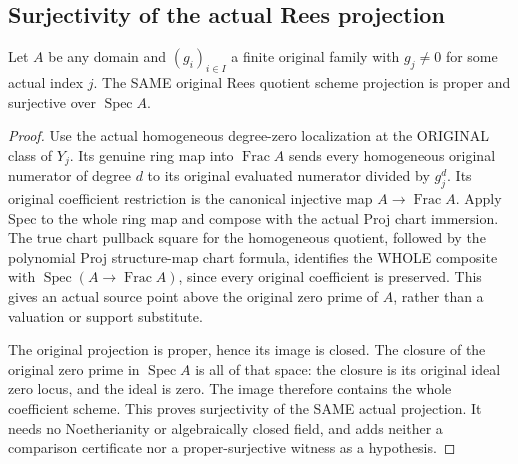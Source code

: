 \subsection{Surjectivity of the actual Rees projection}

\begin{theorem}
\label{scheme:actual-rees-projection-surjective}
\leanok
{}
Let $A$ be any domain and $(g_i)_{i\in I}$ a finite original family with
$g_j\ne0$ for some actual index $j$. The SAME original Rees quotient scheme
projection is proper and surjective over $\operatorname{Spec}A$.
\end{theorem}
\begin{proof}
Use the actual homogeneous degree-zero localization at the ORIGINAL class
of $Y_j$. Its genuine ring map into $\operatorname{Frac}A$ sends every
homogeneous original numerator of degree $d$ to its original evaluated
numerator divided by $g_j^d$. Its original coefficient restriction is the
canonical injective map $A\to\operatorname{Frac}A$. Apply Spec to the whole
ring map and compose with the actual Proj chart immersion. The true chart
pullback square for the homogeneous quotient, followed by the polynomial
Proj structure-map chart formula, identifies the WHOLE composite with
$\operatorname{Spec}(A\to\operatorname{Frac}A)$, since every original
coefficient is preserved. This gives an actual source point above the
original zero prime of $A$, rather than a valuation or support substitute.

The original projection is proper, hence its image is closed. The closure
of the original zero prime in $\operatorname{Spec}A$ is all of that space:
the closure is its original ideal zero locus, and the ideal is zero.
The image therefore contains the whole coefficient scheme. This proves
surjectivity of the SAME actual projection. It needs no Noetherianity or
algebraically closed field, and adds neither a comparison certificate nor
a proper-surjective witness as a hypothesis.
\end{proof}
